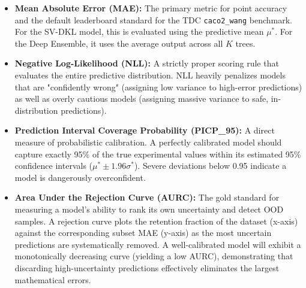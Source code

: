 \begin{itemize}
    \item \textbf{Mean Absolute Error (MAE):} The primary metric for point accuracy and the default leaderboard standard for the TDC \texttt{caco2\_wang} benchmark. For the SV-DKL model, this is evaluated using the predictive mean $\mu^*$. For the Deep Ensemble, it uses the average output across all $K$ trees.
    
    \item \textbf{Negative Log-Likelihood (NLL):} A strictly proper scoring rule that evaluates the entire predictive distribution. NLL heavily penalizes models that are "confidently wrong" (assigning low variance to high-error predictions) as well as overly cautious models (assigning massive variance to safe, in-distribution predictions).
    
    \item \textbf{Prediction Interval Coverage Probability (PICP\_95):} A direct measure of probabilistic calibration. A perfectly calibrated model should capture exactly 95\% of the true experimental values within its estimated 95\% confidence intervals ($\mu^* \pm 1.96\sigma^*$). Severe deviations below 0.95 indicate a model is dangerously overconfident.
    
    \item \textbf{Area Under the Rejection Curve (AURC):} The gold standard for measuring a model's ability to rank its own uncertainty and detect OOD samples. A rejection curve plots the retention fraction of the dataset (x-axis) against the corresponding subset MAE (y-axis) as the most uncertain predictions are systematically removed. A well-calibrated model will exhibit a monotonically decreasing curve (yielding a low AURC), demonstrating that discarding high-uncertainty predictions effectively eliminates the largest mathematical errors.
\end{itemize}